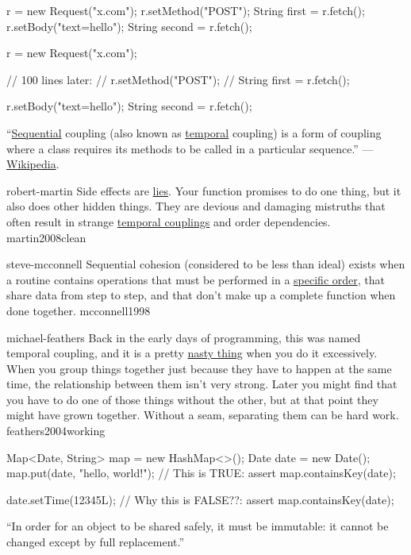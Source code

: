 \documentclass{article}
\begin{document}
\begin{pptWide}{2}
{\small\begin{ffcode}
r = new Request("x.com");
r.setMethod("POST");
String first = r.fetch();
r.setBody("text=hello");
String second = r.fetch();
\end{ffcode}
}
\par\columnbreak\par
{\small\begin{ffcode}
r = new Request("x.com");

// 100 lines later:
// r.setMethod("POST");
// String first = r.fetch();

r.setBody("text=hello");
String second = r.fetch();
\end{ffcode}
}
\end{pptWide}
\par
``\ul{Sequential} coupling (also known as \ul{temporal} coupling) is a form of coupling where a class requires its methods to be called in a particular sequence.'' --- \href{https://en.wikipedia.org/wiki/Sequential_coupling}{Wikipedia}.
\plush{}

\qte
  {robert-martin}
  {Side effects are \ul{lies}. Your function promises to do one thing, but it also does other hidden things. They are devious and damaging mistruths that often result in strange \ul{temporal couplings} and order dependencies.}
  {martin2008clean}

\qte
  {steve-mcconnell}
  {Sequential cohesion (considered to be less than ideal) exists when a routine contains operations that must be performed in a \ul{specific order}, that share data from step to step, and that don't make up a complete function when done together.}
  {mcconnell1998}

\qte
  {michael-feathers}
  {Back in the early days of programming, this was named temporal coupling, and it is a pretty \ul{nasty thing} when you do it excessively. When you group things together just because they have to happen at the same time, the relationship between them isn’t very strong. Later you might find that you have to do one of those things without the other, but at that point they might have grown together. Without a seam, separating them can be hard work.}
  {feathers2004working}

\begin{pptWide}{2}
{\small\begin{ffcode}
Map<Date, String> map = new HashMap<>();
Date date = new Date();
map.put(date, "hello, world!");
// This is TRUE:
assert map.containsKey(date);

date.setTime(12345L);
// Why this is FALSE??:
assert map.containsKey(date);
\end{ffcode}
}
\par\columnbreak\par
``In order for an object to be shared safely, it must be immutable: it cannot be changed except by full replacement.''\par
{}
\end{pptWide}
\plush{}
\end{document}

